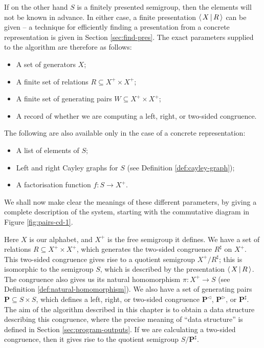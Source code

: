 If on the
other hand $S$ is a finitely presented semigroup, then the elements will not be
known in advance.  In either case, a finite presentation $\left\langle \, X \, \middle| \, R \, \right\rangle$ can be
given -- a technique for efficiently finding a presentation from a concrete
representation is given in Section \ref{sec:find-pres}.
The exact parameters supplied to the algorithm are therefore as follows:
\begin{itemize}
\item A set of generators $X$;
\item A finite set of relations $R \subseteq X^+ \times X^+$;
\item A finite set of generating pairs $W \subseteq X^+ \times X^+$;
\item A record of whether we are computing a left, right, or two-sided
  congruence.
\end{itemize}
The following are also available only in the case of a concrete representation:
\begin{itemize}
\item A list of elements of $S$;
\item Left and right Cayley graphs for $S$ (see Definition
  \ref{def:cayley-graph});
\item A factorisation function $f : S \to X^+$.
\end{itemize}

We shall now make clear the meanings of these different parameters, by giving a
complete description of the system, starting with the commutative diagram in
Figure \ref{fig:pairs-cd-1}.

Here $X$ is our alphabet, and $X^+$ is the free semigroup it defines.  We have a set
of relations $R \subseteq X^+ \times X^+$, which generates the two-sided
congruence $R^\sharp$ on $X^+$.  This two-sided congruence gives rise to a
quotient semigroup $X^+ / R^\sharp$; this is isomorphic to the semigroup $S$,
which is described by the presentation $\left\langle \, X \, \middle| \, R \, \right\rangle$.  The congruence also gives
us its natural homomorphism $\pi: X^+ \to S$ (see Definition
\ref{def:natural-homomorphism}).  We also have a set of generating pairs
$\mathbf{P} \subseteq S \times S$, which defines a left, right, or two-sided
congruence $\mathbf{P}^\triangleleft$, $\mathbf{P}^\triangleright$, or
$\mathbf{P}^\sharp$.  The aim of the algorithm described in this chapter is to
obtain a data structure describing this congruence, where the precise meaning of
``data structure'' is defined in Section \ref{sec:program-outputs}.  If we are
calculating a two-sided congruence, then it gives rise to the quotient semigroup
$S / \mathbf{P}^\sharp$.

